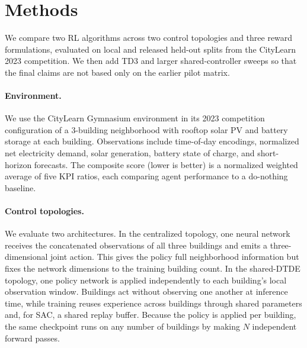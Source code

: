 \documentclass{article}
\begin{document}
\section{Methods}\label{sec:methods}

We compare two RL algorithms across two control topologies and three reward formulations, evaluated on local and released held-out splits from the CityLearn 2023 competition. We then add TD3 and larger shared-controller sweeps so that the final claims are not based only on the earlier pilot matrix.

\paragraph{Environment.} We use the CityLearn Gymnasium environment \citep{vazquez2020citylearn, citylearnrepo} in its 2023 competition configuration of a 3-building neighborhood with rooftop solar PV and battery storage at each building. Observations include time-of-day encodings, normalized net electricity demand, solar generation, battery state of charge, and short-horizon forecasts. The composite score (lower is better) is a normalized weighted average of five KPI ratios, each comparing agent performance to a do-nothing baseline.

\paragraph{Control topologies.} We evaluate two architectures. In the centralized topology, one neural network receives the concatenated observations of all three buildings and emits a three-dimensional joint action. This gives the policy full neighborhood information but fixes the network dimensions to the training building count. In the shared-DTDE topology, one policy network is applied independently to each building's local observation window. Buildings act without observing one another at inference time, while training reuses experience across buildings through shared parameters and, for SAC, a shared replay buffer. Because the policy is applied per building, the same checkpoint runs on any number of buildings by making $N$ independent forward passes.
\end{document}

